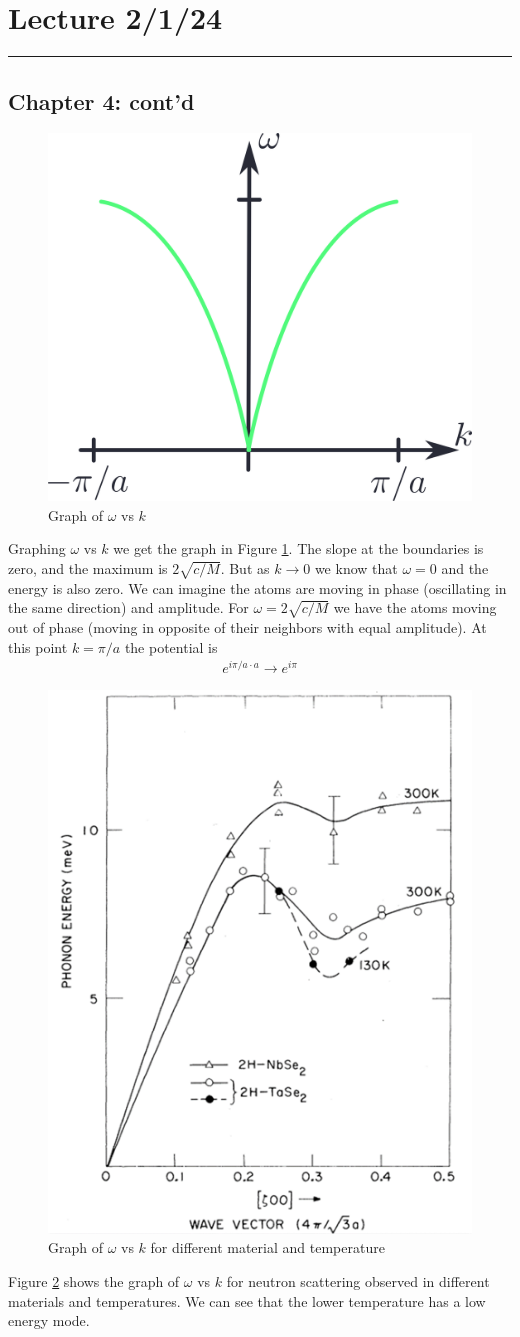 \documentclass[../main.tex]{subfiles}
\begin{document}
\pagebreak
\section{Lecture 2/1/24}
\hrule \vspace{10px}

\subsection*{Chapter 4: cont'd}
\begin{figure} [ht]
    \centering
    \includegraphics[width=0.4\linewidth]{phonon1.png}
    \caption{Graph of $\omega$ vs $k$}
    \label{fig:5.1}
\end{figure}

Graphing $\omega$ vs $k$ we get the graph in Figure \ref{fig:5.1}. The slope at the boundaries is
zero, and the maximum is $2\sqrt{c/M}$. But as $k \to 0$ we know that $\omega = 0$ and the energy
is also zero. We can imagine the atoms are moving in phase (oscillating in the same direction) and
amplitude. For $\omega = 2\sqrt{c/M}$ we have the atoms moving out of phase (moving in opposite of
their neighbors with equal amplitude). At this point $k = \pi/a$ the potential is
\begin{align*}
    e^{i\pi/a \cdot a} \to e^{i\pi}
\end{align*}

\begin{figure}[ht]
    \centering
    \includegraphics[width=0.4\linewidth]{phonon2.png}
    \caption{Graph of $\omega$ vs $k$ for different material and temperature}
    \label{fig:5.2}
\end{figure}
Figure \ref{fig:5.2} shows the graph of $\omega$ vs $k$ for neutron scattering observed in different
materials and temperatures. We can see that the lower temperature has a low energy mode. 
\end{document}

